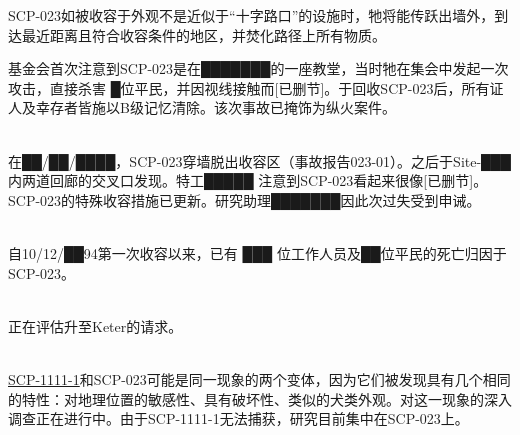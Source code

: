 SCP-023如被收容于外观不是近似于“十字路口”的设施时，牠将能传跃出墙外，到达最近距离且符合收容条件的地区，并焚化路径上所有物质。

基金会首次注意到SCP-023是在███████的一座教堂，当时牠在集会中发起一次攻击，直接杀害 █位平民，并因视线接触而[已删节]。于回收SCP-023后，所有证人及幸存者皆施以B级记忆清除。该次事故已掩饰为纵火案件。

\\
在██\slash ██\slash ████，SCP-023穿墙脱出收容区（事故报告023-01）。之后于Site-███内两道回廊的交叉口发现。特工█████ 注意到SCP-023看起来很像[已删节]。SCP-023的特殊收容措施已更新。研究助理███████因此次过失受到申诫。

\\
自10\slash 12\slash ██94第一次收容以来，已有 ███ 位工作人员及██位平民的死亡归因于SCP-023。

\\
正在评估升至Keter的请求。

\\
\hyperref[chap:SCP-1111]{SCP-1111-1}和SCP-023可能是同一现象的两个变体，因为它们被发现具有几个相同的特性：对地理位置的敏感性、具有破坏性、类似的犬类外观。对这一现象的深入调查正在进行中。由于SCP-1111-1无法捕获，研究目前集中在SCP-023上。

\newpage


\newpage

